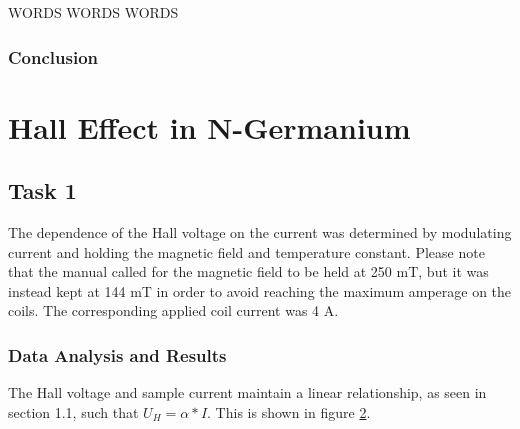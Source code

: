 \documentclass[a4paper]{article}
\begin{document}
\begin{figure}[H]
\centering
\label{task25plot}
\end{figure}

WORDS WORDS WORDS


\subsubsection{Conclusion}

\section{Hall Effect in N-Germanium}

\subsection{Task 1}

\qq The dependence of the Hall voltage on the current was determined 
by modulating current and holding the magnetic field and temperature 
constant. Please note that the manual called for the magnetic field to 
be held at 250 mT, but it was instead kept at 144 mT in order to 
avoid reaching the maximum amperage on the coils. The corresponding
applied coil current was 4 A.

\subsubsection{Data Analysis and Results}
\qq The Hall voltage and sample current maintain a linear
relationship, as seen in section 1.1, such that $U_H = \alpha *
I$. This is shown in figure \ref{task31plot}.

\begin{figure}[H]
\centering
\label{task31plot}
\end{figure}
\end{document}
